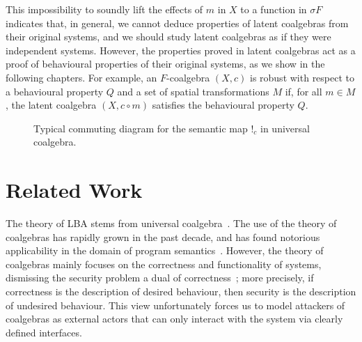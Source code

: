 {This impossibility to soundly lift the effects of $m$ in $X$ to a function in $\sigma F$ indicates that, in general, we cannot deduce properties of latent coalgebras from their original systems, and we should study latent coalgebras as if they were independent systems. However, the properties proved in latent coalgebras act as a proof of behavioural properties of their original systems, as we show in the following chapters. For example, an $F$-coalgebra $(X,c)$ is robust with respect to a behavioural property $Q$ and a set of spatial transformations $M$ if, for all $m\in M$, the latent coalgebra $(X,c\circ m)$ satisfies the behavioural property $Q$.

\begin{figure}[t]
\centering
{}
\caption{Typical commuting diagram for the semantic map $!_c$ in universal coalgebra.}
\label{fig:SemanticsMap} 
\end{figure}

\section{Related Work}
The theory of LBA stems from universal coalgebra~\cite{UniversalCoalgebra}. The use of the theory of coalgebras has rapidly grown in the past decade, and has found notorious applicability in the domain of program semantics~\cite{GKAT,GKATCoequations}. However, the theory of coalgebras mainly focuses on the correctness and functionality of systems, dismissing the security problem a dual of correctness~\cite{JacobsBook}; more precisely, if correctness is the description of desired behaviour, then security is the description of undesired behaviour. This view unfortunately forces us to model attackers of coalgebras as external actors that can only interact with the system via clearly defined interfaces. 

}
